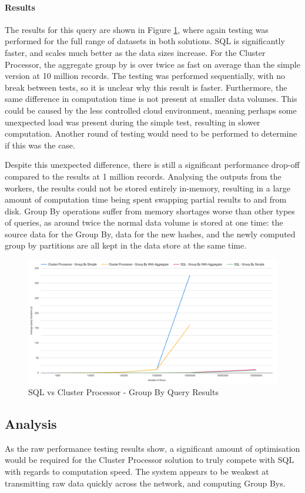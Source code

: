 \paragraph{Results}
The results for this query are shown in Figure \ref{fig:group-by-graph}, where again testing was performed for the full range of datasets in both solutions. SQL is significantly faster, and scales much better as the data sizes increase. For the Cluster Processor, the aggregate group by is over twice as fast on average than the simple version at 10 million records. The testing was performed sequentially, with no break between tests, so it is unclear why this result is faster. Furthermore, the same difference in computation time is not present at smaller data volumes. This could be caused by the less controlled cloud environment, meaning perhaps some unexpected load was present during the simple test, resulting in slower computation. Another round of testing would need to be performed to determine if this was the case.

Despite this unexpected difference, there is still a significant performance drop-off compared to the results at 1 million records. Analysing the outputs from the workers, the results could not be stored entirely in-memory, resulting in a large amount of computation time being spent swapping partial results to and from disk. Group By operations suffer from memory shortages worse than other types of queries, as around twice the normal data volume is stored at one time: the source data for the Group By, data for the new hashes, and the newly computed group by partitions are all kept in the data store at the same time.

\begin{figure}[htp]
	\centering
	\includegraphics[width=0.8\linewidth]{chapters/diagrams/testing/group-by-1k-100m}
	\caption{SQL vs Cluster Processor - Group By Query Results}
	\label{fig:group-by-graph}
\end{figure}

\subsection{Analysis}\label{subsec:sql-cluster-processor-analysis}
As the raw performance testing results show, a significant amount of optimisation would be required for the Cluster Processor solution to truly compete with SQL with regards to computation speed. The system appears to be weakest at transmitting raw data quickly across the network, and computing Group Bys.

